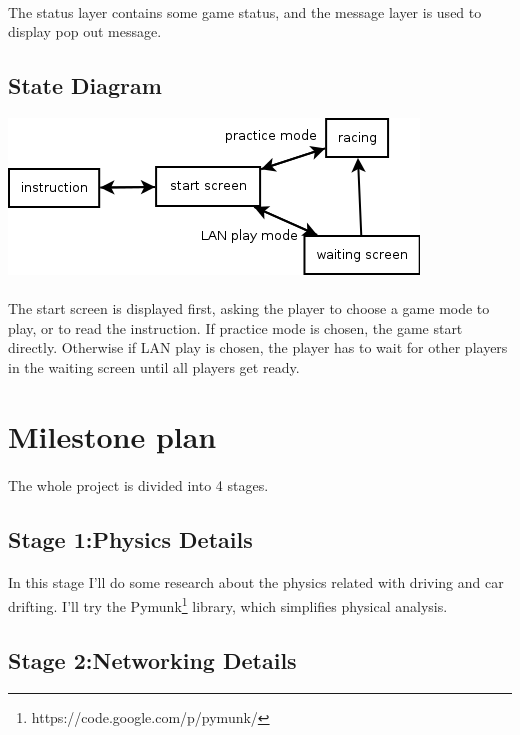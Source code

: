 \documentclass{article}
\begin{document}
    \paragraph{}
        The status layer contains some game status, and the message layer is used to display pop out message.
    \subsection{State Diagram}
    \includegraphics[scale=0.6]{state-diagram.png}
    \paragraph{}
        The start screen is displayed first, asking the player to choose a game mode to play, or to read the instruction. If practice mode is chosen, the game start directly. Otherwise if LAN play is chosen, the player has to wait for other players in the waiting screen until all players get ready.
\section{Milestone plan}
\paragraph{}
    The whole project is divided into 4 stages.
    \subsection*{Stage 1:Physics Details}
    \paragraph{}
        In this stage I'll do some research about the physics related with driving and car drifting. I'll try the Pymunk\footnote{https://code.google.com/p/pymunk/} library, which simplifies physical analysis.
    \subsection*{Stage 2:Networking Details}
\end{document}
